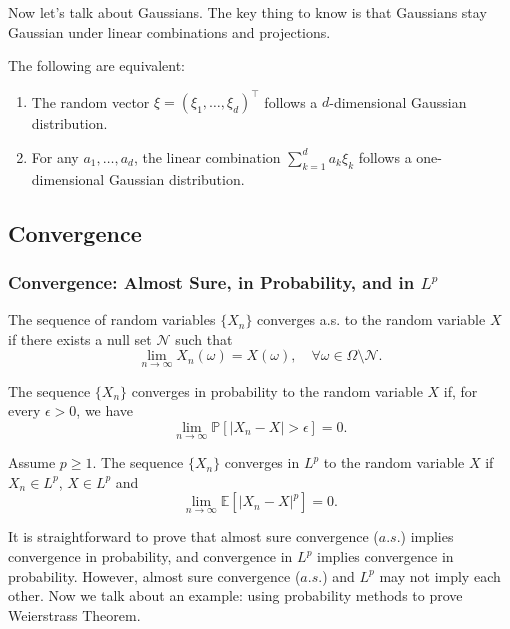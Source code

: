 Now let's talk about Gaussians. The key thing to know is that Gaussians stay Gaussian under linear combinations and projections.
\begin{prop}
   The following are equivalent:
    \begin{enumerate}
        \item The random vector \( \xi = (\xi_1, \dots, \xi_d)^\top \) follows a \( d \)-dimensional Gaussian distribution.
        \item For any \( a_1, \dots, a_d \), the linear combination \( \sum_{k=1}^d a_k \xi_k \) follows a one-dimensional Gaussian distribution.
    \end{enumerate} 
\end{prop}


\subsection{Convergence}
\subsubsection{Convergence: Almost Sure, in Probability, and in \texorpdfstring{$L^p$}{Lp}}
\begin{defn}
    The sequence of random variables \( \{ X_n \} \) converges a.s. to the random variable \( X \) if there exists a null set \( \mathcal{N} \) such that
    \[
    \lim_{n \to \infty} X_n(\omega) = X(\omega), \quad \forall \omega \in \Omega \setminus \mathcal{N}.
    \]
\end{defn}

\begin{defn} 
    The sequence \( \{ X_n \} \) converges in probability to the random variable \( X \) if, for every \( \epsilon > 0 \), we have
    \[
    \lim_{n \to \infty} \mathbb{P}[|X_n - X| > \epsilon] = 0.
    \]
\end{defn}

\begin{defn}[Convergence in \( L^p \))] 
    Assume \( p \geq 1 \). The sequence \( \{ X_n \} \) converges in \( L^p \) to the random variable \( X \) if \( X_n \in L^p \), \( X \in L^p \) and
    \[
    \lim_{n \to \infty} \mathbb{E}[|X_n - X|^p] = 0.
    \]
\end{defn}

It is straightforward to prove that almost sure convergence (\(a.s.\)) implies convergence in probability, and convergence in \(L^p\) implies convergence in probability. However, almost sure convergence (\(a.s.\)) and \(L^p\) may not imply each other. Now we talk about an example: using probability methods to prove Weierstrass Theorem.

